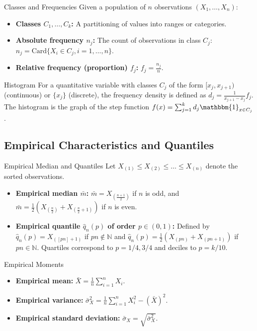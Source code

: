 \documentclass[11pt, a4paper]{article}
\begin{document}
\begin{definition}{Classes and Frequencies}{}
Given a population of $n$ observations $(X_1, \dots, X_n)$:
\begin{itemize}
    \item \textbf{Classes $C_1, \dots, C_k$:} A partitioning of values into ranges or categories.
    \item \textbf{Absolute frequency $n_j$:} The count of observations in class $C_j$: $n_j = \text{Card}\{X_i \in C_j, i = 1, \dots, n\}$.
    \item \textbf{Relative frequency (proportion) $f_j$:} $f_j = \frac{n_j}{n}$.
\end{itemize}
\end{definition}

\begin{definition}{Histogram}{}
For a quantitative variable with classes $C_j$ of the form $[x_j, x_{j+1})$ (continuous) or $\{x_j\}$ (discrete), the frequency density is defined as $d_j = \frac{1}{x_{j+1} - x_j} f_j$. The histogram is the graph of the step function $f(x) = \sum_{j=1}^k d_j \mathbbm{1}_{x \in C_j}$.
\end{definition}

\subsection{Empirical Characteristics and Quantiles}

\begin{definition}{Empirical Median and Quantiles}{}
Let $X_{(1)} \le X_{(2)} \le \dots \le X_{(n)}$ denote the sorted observations.
\begin{itemize}
    \item \textbf{Empirical median $\bar{m}$:} $\bar{m} = X_{(\frac{n+1}{2})}$ if $n$ is odd, and $\bar{m} = \frac{1}{2}\left(X_{(\frac{n}{2})} + X_{(\frac{n}{2}+1)}\right)$ if $n$ is even.
    \item \textbf{Empirical quantile $\hat{q}_n(p)$ of order $p \in (0,1)$:} Defined by $\hat{q}_n(p) = X_{([pn]+1)}$ if $pn \notin \mathbb{N}$ and $\hat{q}_n(p) = \frac{1}{2}(X_{(pn)} + X_{(pn+1)})$ if $pn \in \mathbb{N}$. Quartiles correspond to $p = 1/4, 3/4$ and deciles to $p = k/10$.
\end{itemize}
\end{definition}

\begin{definition}{Empirical Moments}{}
\begin{itemize}
    \item \textbf{Empirical mean:} $\bar{X} = \frac{1}{n}\sum_{i=1}^n X_i$.
    \item \textbf{Empirical variance:} $\bar{\sigma}_X^2 = \frac{1}{n}\sum_{i=1}^n X_i^2 - (\bar{X})^2$.
    \item \textbf{Empirical standard deviation:} $\bar{\sigma}_X = \sqrt{\bar{\sigma}_X^2}$.
\end{itemize}
\end{definition}
\end{document}
